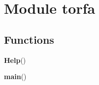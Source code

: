 %
%
%


\section{Module torfa}

    \label{torfa}


  \subsection{Functions}

    \label{torfa:Help}

    \vspace{0.5ex}

\hspace{.8\funcindent}\begin{boxedminipage}{\funcwidth}

    \raggedright \textbf{Help}()

\setlength{\parskip}{2ex}
\setlength{\parskip}{1ex}
    \end{boxedminipage}

    \label{torfa:main}

    \vspace{0.5ex}

\hspace{.8\funcindent}\begin{boxedminipage}{\funcwidth}

    \raggedright \textbf{main}()

\setlength{\parskip}{2ex}
\setlength{\parskip}{1ex}
    \end{boxedminipage}




